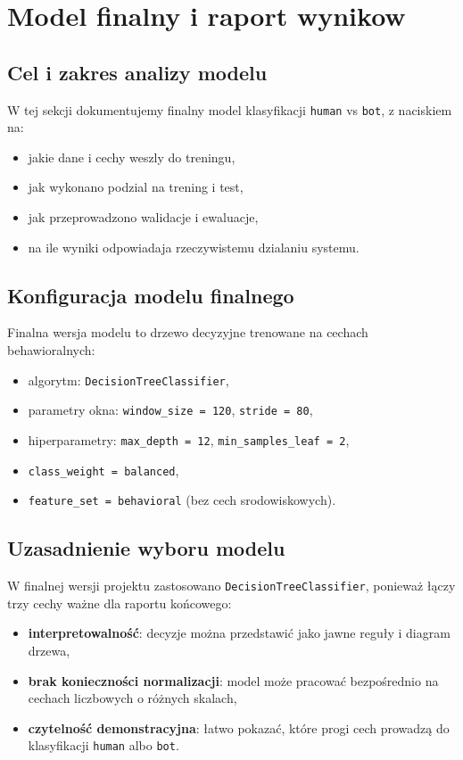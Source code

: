 ﻿\section{Model finalny i raport wynikow}

\subsection{Cel i zakres analizy modelu}
W tej sekcji dokumentujemy finalny model klasyfikacji \texttt{human} vs \texttt{bot},
z naciskiem na:
\begin{itemize}
  \item jakie dane i cechy weszly do treningu,
  \item jak wykonano podzial na trening i test,
  \item jak przeprowadzono walidacje i ewaluacje,
  \item na ile wyniki odpowiadaja rzeczywistemu dzialaniu systemu.
\end{itemize}

\subsection{Konfiguracja modelu finalnego}
Finalna wersja modelu to drzewo decyzyjne trenowane na cechach behawioralnych:
\begin{itemize}
  \item algorytm: \texttt{DecisionTreeClassifier},
  \item parametry okna: \texttt{window\_size = 120}, \texttt{stride = 80},
  \item hiperparametry: \texttt{max\_depth = 12}, \texttt{min\_samples\_leaf = 2},
  \item \texttt{class\_weight = balanced},
  \item \texttt{feature\_set = behavioral} (bez cech srodowiskowych).
\end{itemize}

\subsection{Uzasadnienie wyboru modelu}
W finalnej wersji projektu zastosowano \texttt{DecisionTreeClassifier}, ponieważ
łączy trzy cechy ważne dla raportu końcowego:
\begin{itemize}
  \item \textbf{interpretowalność}: decyzje można przedstawić jako jawne reguły
  i diagram drzewa,
  \item \textbf{brak konieczności normalizacji}: model może pracować bezpośrednio
  na cechach liczbowych o różnych skalach,
  \item \textbf{czytelność demonstracyjna}: łatwo pokazać, które progi cech
  prowadzą do klasyfikacji \texttt{human} albo \texttt{bot}.
\end{itemize}

